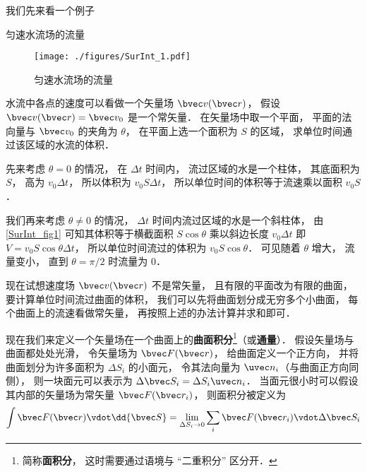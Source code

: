 

我们先来看一个例子

\begin{example}{匀速水流场的流量}\label{SurInt_ex1}

\begin{figure}[ht]
\centering
\texttt{[image: ./figures/SurInt\_1.pdf]}
\caption{匀速水流场的流量} \label{SurInt_fig1}
\end{figure}

水流中各点的速度可以看做一个矢量场 $\bvec v(\bvec r)$， 假设 $\bvec v(\bvec r) = \bvec v_0$ 是一个常矢量． 在矢量场中取一个平面， 平面的法向量与 $\bvec v_0$ 的夹角为 $\theta$， 在平面上选一个面积为 $S$ 的区域， 求单位时间通过该区域的水流的体积．

先来考虑 $\theta = 0$ 的情况， 在 $\Delta t$ 时间内， 流过区域的水是一个柱体， 其底面积为 $S$， 高为 $v_0\Delta t$， 所以体积为 $v_0 S\Delta t$， 所以单位时间的体积等于流速乘以面积 $v_0 S$．

我们再来考虑 $\theta \ne 0$ 的情况， $\Delta t$ 时间内流过区域的水是一个斜柱体， 由\autoref{SurInt_fig1} 可知其体积等于横截面积 $S\cos\theta$ 乘以斜边长度 $v_0\Delta t$ 即 $V = v_0 S\cos\theta\Delta t$， 所以单位时间流过的体积为 $v_0 S\cos\theta$． 可见随着 $\theta$ 增大， 流量变小， 直到 $\theta = \pi/2$ 时流量为 $0$．

现在试想速度场 $\bvec v(\bvec r)$ 不是常矢量， 且有限的平面改为有限的曲面， 要计算单位时间流过曲面的体积， 我们可以先将曲面划分成无穷多个小曲面， 每个曲面上的流速看做常矢量， 再按照上述的办法计算并求和即可．
\end{example}

现在我们来定义一个矢量场在一个曲面上的\textbf{曲面积分}\footnote{简称\textbf{面积分}， 这时需要通过语境与 “二重积分” 区分开．}（或\textbf{通量}）． 假设矢量场与曲面都处处光滑， 令矢量场为 $\bvec F(\bvec r)$， 给曲面定义一个正方向， 并将曲面划分为许多面积为 $\Delta S_i$ 的小面元， 令其法向量为 $\uvec n_i$（与曲面正方向同侧）， 则一块面元可以表示为 $\Delta \bvec S_i = \Delta S_i \uvec n_i$． 当面元很小时可以假设其内部的矢量场为常矢量 $\bvec F(\bvec r_i)$， 则面积分被定义为
\begin{equation}\label{SurInt_eq1}
\int \bvec F(\bvec r) \vdot \dd{\bvec S} = \lim_{\Delta S_i\to 0} \sum_i \bvec F(\bvec r_i) \vdot \Delta \bvec S_i
\end{equation}

